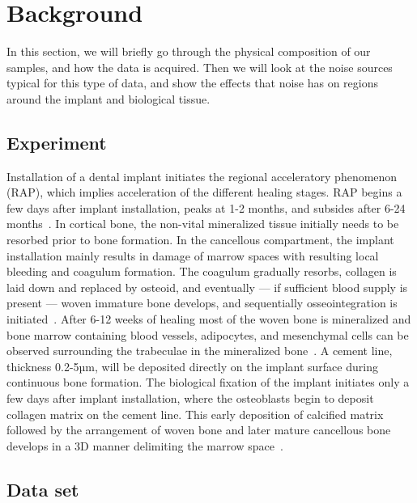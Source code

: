 \section{Background}
\label{sec:background}

In this section, we will briefly go through the physical composition of our samples, and how the
data is acquired. Then we will look at the noise sources typical for this type of data, and show
the effects that noise has on regions around the implant and biological tissue.

\subsection{Experiment}
Installation of a dental implant initiates the regional acceleratory phenomenon (RAP), which
implies acceleration of the different healing stages. RAP begins a few days after implant
installation, peaks at 1-2 months, and subsides after 6-24 months~\cite{frost1989}. In cortical bone,
the non-vital mineralized tissue initially needs to be resorbed prior to bone formation. In the
cancellous compartment, the implant installation mainly results in damage of marrow spaces with
resulting local bleeding and coagulum formation. The coagulum gradually resorbs, collagen is laid
down and replaced by osteoid, and eventually --- if sufficient blood supply is present --- woven immature
bone develops, and sequentially osseointegration is initiated~\cite{frost1989}. After 6-12 weeks of
healing most of the woven bone is mineralized and bone marrow containing blood vessels, adipocytes,
and mesenchymal cells can be observed surrounding the trabeculae in the mineralized bone~\cite{Berglundh2003, Abrahamsson2004}.
A cement line, thickness  0.2-5µm, will be deposited
directly on the implant surface during continuous bone formation. The biological fixation of the
implant initiates only a few days after implant installation, where the osteoblasts begin to deposit
collagen matrix on the cement line. This early deposition of calcified matrix followed by the
arrangement of woven bone and later mature cancellous bone develops in a 3D manner delimiting the
marrow space~\cite{Franchi2004}.

%

\subsection{Data set}

